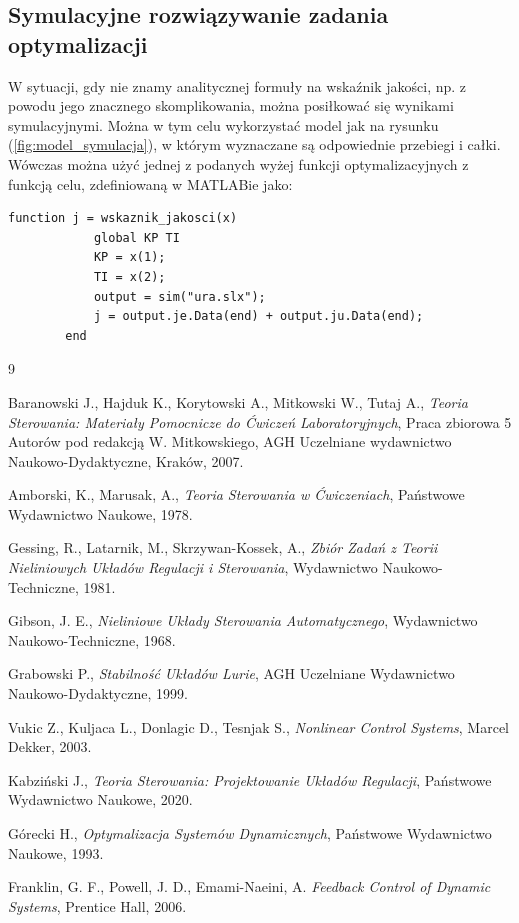 \documentclass{article}
\begin{document}
    \subsection{Symulacyjne rozwiązywanie zadania optymalizacji}
    W sytuacji, gdy nie znamy analitycznej formuły na wskaźnik jakości, np. z powodu jego znacznego skomplikowania, można posiłkować się wynikami symulacyjnymi.
    Można w tym celu wykorzystać model jak na rysunku (\ref{fig:model_symulacja}), w którym wyznaczane są odpowiednie przebiegi i całki.
    Wówczas można użyć jednej z podanych wyżej funkcji optymalizacyjnych z funkcją celu, zdefiniowaną w MATLABie jako:
    \begin{lstlisting}[style=Matlab-editor]
        function j = wskaznik_jakosci(x)
            global KP TI
            KP = x(1);
            TI = x(2);
            output = sim("ura.slx");
            j = output.je.Data(end) + output.ju.Data(end);
        end
    \end{lstlisting}


\newpage
\begin{thebibliography}{9}

  Baranowski J., Hajduk K., Korytowski A., Mitkowski W., Tutaj A.,
  \emph{Teoria Sterowania: Materiały Pomocnicze do Ćwiczeń Laboratoryjnych},
  Praca zbiorowa 5 Autorów pod redakcją W. Mitkowskiego,
  AGH Uczelniane wydawnictwo Naukowo-Dydaktyczne,
  Kraków, 2007.

  Amborski, K., Marusak, A.,
  \emph{Teoria Sterowania w Ćwiczeniach},
  Państwowe Wydawnictwo Naukowe,
  1978.

  Gessing, R., Latarnik, M., Skrzywan-Kossek, A.,
  \emph{Zbiór Zadań z Teorii Nieliniowych Układów Regulacji i Sterowania},
  Wydawnictwo Naukowo-Techniczne,
  1981.

  Gibson, J. E.,
  \emph{Nieliniowe Układy Sterowania Automatycznego},
  Wydawnictwo Naukowo-Techniczne,
  1968.

  Grabowski P.,
  \emph{Stabilność Układów Lurie},
  AGH Uczelniane Wydawnictwo Naukowo-Dydaktyczne,
  1999.


  Vukic Z., Kuljaca L., Donlagic D., Tesnjak S.,
  \emph{Nonlinear Control Systems},
  Marcel Dekker,
  2003.

  Kabziński J.,
  \emph{Teoria Sterowania: Projektowanie Układów Regulacji},
  Państwowe Wydawnictwo Naukowe,
  2020.

  Górecki H.,
  \emph{Optymalizacja Systemów Dynamicznych},
  Państwowe Wydawnictwo Naukowe,
  1993.

  Franklin, G. F., Powell, J. D., Emami-Naeini, A.
  \emph{Feedback Control of Dynamic Systems},
  Prentice Hall,
  2006.

\end{thebibliography}
\end{document}
